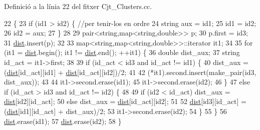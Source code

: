 Definició a la línia 22 del fitxer Cjt\+\_\+\+Clusters.\+cc.


\begin{DoxyCode}
22                                                                                   \{   
23     \textcolor{keywordflow}{if} (id1 > id2) \{ \textcolor{comment}{//per tenir-los en ordre}
24         \textcolor{keywordtype}{string} aux = id1;
25         id1 = id2;
26         id2 = aux;
27     \} 
28 
29     pair<string,map<string,double>> p;
30     p.first = id3;
31     \hyperlink{class_cjt___clusters_afde449634787205786301b40e053fe91}{dist}.insert(p);
32     
33     map<string,map<string,double>>::iterator it1;
34     
35     \textcolor{keywordflow}{for} (it1 = \hyperlink{class_cjt___clusters_afde449634787205786301b40e053fe91}{dist}.begin(); it1 != \hyperlink{class_cjt___clusters_afde449634787205786301b40e053fe91}{dist}.end(); ++it1) \{        
36         \textcolor{keywordtype}{double} dist\_aux;
37         \textcolor{keywordtype}{string} id\_act = it1->first;
38         
39         \textcolor{keywordflow}{if} (id\_act < id3 and id\_act != id1) \{            
40             dist\_aux = (\hyperlink{class_cjt___clusters_afde449634787205786301b40e053fe91}{dist}[id\_act][id1] + \hyperlink{class_cjt___clusters_afde449634787205786301b40e053fe91}{dist}[id\_act][id2])/2;
41             
42             (*it1).second.insert(make\_pair(id3, dist\_aux));
43             
44             it1->second.erase(id1);
45             it1->second.erase(id2);        
46         \}
47         \textcolor{keywordflow}{else} \textcolor{keywordflow}{if} (id\_act > id3 and id\_act != id2) \{
48             
49             \textcolor{keywordflow}{if} (id2 < id\_act) dist\_aux = \hyperlink{class_cjt___clusters_afde449634787205786301b40e053fe91}{dist}[id2][id\_act];
50             \textcolor{keywordflow}{else} dist\_aux = \hyperlink{class_cjt___clusters_afde449634787205786301b40e053fe91}{dist}[id\_act][id2];
51             
52             \hyperlink{class_cjt___clusters_afde449634787205786301b40e053fe91}{dist}[id3][id\_act] = (\hyperlink{class_cjt___clusters_afde449634787205786301b40e053fe91}{dist}[id1][id\_act] + dist\_aux)/2;
53             it1->second.erase(id2);
54         \}
55     \}
56     \hyperlink{class_cjt___clusters_afde449634787205786301b40e053fe91}{dist}.erase(id1);
57     \hyperlink{class_cjt___clusters_afde449634787205786301b40e053fe91}{dist}.erase(id2);
58 \}
\end{DoxyCode}
\mbox{\label{class_cjt___clusters_a3d2a5fe0c02b0b74d030447fc601e9f9}} 
